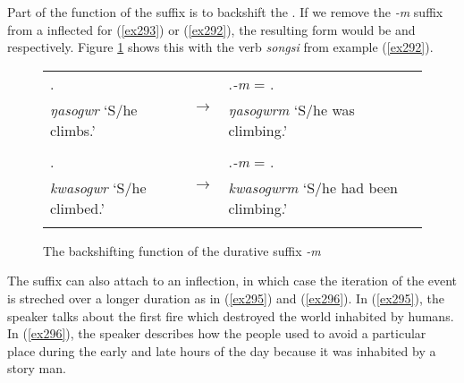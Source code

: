 Part of the function of the  suffix is to backshift the . If we remove the \emph{-m} suffix from a  inflected for   (\ref{ex293}) or   (\ref{ex292}), the resulting form would be   and   respectively. Figure \ref{backshiftdur} shows this with the verb \emph{songsi} from example (\ref{ex292}).

\begin{figure}[h]
\centering
	\begin{tabularx}{\textwidth}{|l|l|l|}
		\cline{1-1} \cline{3-3}
		\Nonpast.\Ipfv &\multirow{2}{*}{$\rightarrow$}& \Nonpast.\Ipfv\emph{-m} = \Rpst.\Dur\\
		\emph{ŋasogwr} `S/he climbs.' && \emph{ŋasogwrm} `S/he was climbing.'\\
		\cline{1-1} \cline{3-3}
		\multicolumn{3}{c}{}\\
		\cline{1-1} \cline{3-3}
		\Rpst.\Ipfv &\multirow{2}{*}{$\rightarrow$}& \Rpst.\Ipfv\emph{-m} = \Pst.\Dur\\
		\emph{kwasogwr} `S/he climbed.' && \emph{kwasogwrm} `S/he had been climbing.'\\
		\cline{1-1} \cline{3-3}
		\multicolumn{3}{c}{}\\
	\end{tabularx}
\caption{The backshifting function of the durative suffix \emph{-m}}
\label{backshiftdur}
\end{figure}%

The  suffix can also attach to an  inflection, in which case the iteration of the event is streched over a longer duration as in (\ref{ex295}) and (\ref{ex296}). In (\ref{ex295}), the speaker talks about the first fire which destroyed the world inhabited by humans. In (\ref{ex296}), the speaker describes how the people used to avoid a particular place during the early and late hours of the day because it was inhabited by a story man.


